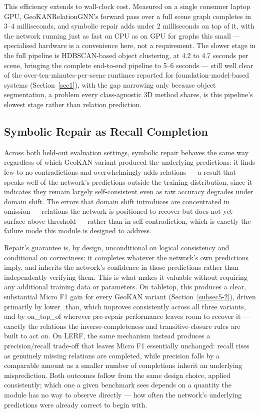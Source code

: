 \documentclass[sn-mathphys,Numbered]{sn-jnl}
\begin{document}
This efficiency extends to wall-clock cost. Measured on a single consumer laptop GPU, GeoKANRelationGNN's forward pass over a full scene graph completes in 3--4 milliseconds, and symbolic repair adds under 2 milliseconds on top of it, with the network running just as fast on CPU as on GPU for graphs this small --- specialised hardware is a convenience here, not a requirement. The slower stage in the full pipeline is HDBSCAN-based object clustering, at 4.2 to 4.7 seconds per scene, bringing the complete end-to-end pipeline to 5--6 seconds --- still well clear of the over-ten-minutes-per-scene runtimes reported for foundation-model-based systems (Section~\ref{sec1}), with the gap narrowing only because object segmentation, a problem every class-agnostic 3D method shares, is this pipeline's slowest stage rather than relation prediction.

\FloatBarrier
\subsection{Symbolic Repair as Recall Completion}\label{subsec5-6}

Across both held-out evaluation settings, symbolic repair behaves the same way regardless of which GeoKAN variant produced the underlying predictions: it finds few to no contradictions and overwhelmingly adds relations --- a result that speaks well of the network's predictions outside the training distribution, since it indicates they remain largely self-consistent even as raw accuracy degrades under domain shift. The errors that domain shift introduces are concentrated in omission --- relations the network is positioned to recover but does not yet surface above threshold --- rather than in self-contradiction, which is exactly the failure mode this module is designed to address.

Repair's guarantee is, by design, unconditional on logical consistency and conditional on correctness: it completes whatever the network's own predictions imply, and inherits the network's confidence in those predictions rather than independently verifying them. This is what makes it valuable without requiring any additional training data or parameters. On tabletop, this produces a clear, substantial Micro F1 gain for every GeoKAN variant (Section~\ref{subsec5-2}), driven primarily by lower\_than, which improves consistently across all three variants, and by on\_top\_of wherever pre-repair performance leaves room to recover it --- exactly the relations the inverse-completeness and transitive-closure rules are built to act on. On LERF, the same mechanism instead produces a precision/recall trade-off that leaves Micro F1 essentially unchanged: recall rises as genuinely missing relations are completed, while precision falls by a comparable amount as a smaller number of completions inherit an underlying misprediction. Both outcomes follow from the same design choice, applied consistently; which one a given benchmark sees depends on a quantity the module has no way to observe directly --- how often the network's underlying predictions were already correct to begin with.
\end{document}
